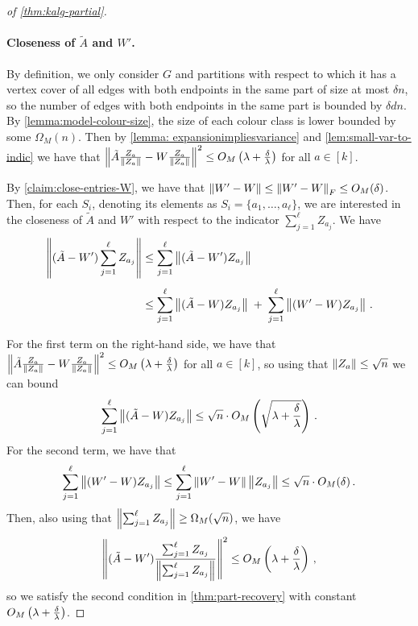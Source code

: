 \begin{proof}[of \cref{thm:kalg-partial}]
    \paragraph{Closeness of $\tilde{A}$ and $W'$.}
    By definition, we only consider $G$ and partitions with respect to which it has a vertex cover of all edges with both endpoints in the same part of size at most $\delta n$, so the number of edges with both endpoints in the same part is bounded by $\delta d n$.
    By \cref{lemma:model-colour-size}, the size of each colour class is lower bounded by some $\Omega_M(n)$.
    Then by \cref{lemma: expansionimpliesvariance} and \cref{lem:small-var-to-indic} we have that $\left\lVert\tilde{A} \frac{Z_a}{\left\lVert Z_a\right\rVert} - W \frac{Z_a}{\left\lVert Z_a\right\rVert}\right\rVert^2 \leq O_M\left(\lambda + \frac{\delta}{\lambda}\right)$ for all $a \in [k]$.

    By \cref{claim:close-entries-W}, we have that $\left\lVert W'-W\right\rVert \leq \left\lVert W'-W\right\rVert_F \leq O_M(\delta)$.
    Then, for each $S_i$, denoting its elements as $S_i = \{a_1, \ldots, a_{\ell}\}$, we are interested in the closeness of $\tilde{A}$ and $W'$ with respect to the indicator $\sum_{j=1}^{\ell} Z_{a_j}$.
    We have
    \[
        \begin{aligned}
        \left\lVert(\tilde{A} - W') \sum_{j=1}^{\ell} Z_{a_j}\right\rVert
            &\le \sum_{j=1}^{\ell} \left\lVert(\tilde{A} - W') Z_{a_j}\right\rVert \\[4pt]
            &\le \sum_{j=1}^{\ell} \left\lVert(\tilde{A} - W)   Z_{a_j}\right\rVert
            \;+\;\sum_{j=1}^{\ell} \left\lVert(W' - W)      Z_{a_j}\right\rVert\,.
        \end{aligned}
    \]

    For the first term on the right-hand side, we have that $\left\lVert\tilde{A} \frac{Z_a}{\left\lVert Z_a\right\rVert} - W \frac{Z_a}{\left\lVert Z_a\right\rVert}\right\rVert^2 \leq O_M\left(\lambda + \frac{\delta}{\lambda}\right)$ for all $a \in [k]$, so using that $\left\lVert Z_a\right\rVert \leq \sqrt{n}$ we can bound
    \[\sum_{j=1}^{\ell} \left\lVert(\tilde{A} - W) Z_{a_j}\right\rVert \leq \sqrt{n} \cdot O_M\left(\sqrt{\lambda + \frac{\delta}{\lambda}}\right)\,.\]
    For the second term, we have that
    \[\sum_{j=1}^{\ell} \left\lVert(W'-W)Z_{a_j}\right\rVert \leq \sum_{j=1}^{\ell} \left\lVert W'-W\right\rVert \left\lVert Z_{a_j}\right\rVert \leq \sqrt{n} \cdot O_M(\delta)\,.\]
    Then, also using that $\left\lVert\sum_{j=1}^{\ell} Z_{a_j}\right\rVert \geq \Omega_M(\sqrt{n})$, we have
    \[\left\lVert(\tilde{A} - W') \frac{\sum_{j=1}^{\ell} Z_{a_j}}{\left\lVert\sum_{j=1}^{\ell} Z_{a_j}\right\rVert}\right\rVert^2 \leq O_M \left(\lambda + \frac{\delta}{\lambda}\right)\,,\]
    so we satisfy the second condition in \cref{thm:part-recovery} with constant $O_M \left(\lambda + \frac{\delta}{\lambda}\right)$.


\end{proof}
